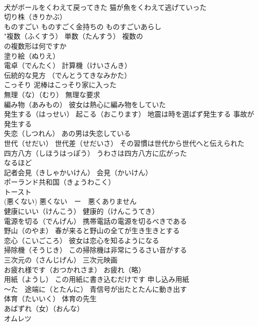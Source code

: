 \documentclass[8pt]{extreport}
\begin{document}
\begin{CJK}{UTF8}{min}
\\	犬がボールをくわえて戻ってきた 猫が魚をくわえて逃げていった
\\	切り株（きりかぶ）
\\	ものすごい ものすごく金持ちの ものすごいあらし
\\	"複数（ふくすう） 単数（たんすう） 複数の 
\\	の複数形は何ですか
\\	塗り絵（ぬりえ）
\\	電卓（でんたく） 計算機（けいさんき）
\\	伝統的な見方 （でんとうてきなみかた）
\\	こっそり 泥棒はこっそり家に入った
\\	無理（な）（むり） 無理な要求
\\	編み物（あみもの） 彼女は熱心に編み物をしていた
\\	発生する（はっせい） 起こる（おこります） 地震は時を選ばず発生する 事故が発生する
\\	失恋（しつれん） あの男は失恋している
\\	世代（せだい） 世代差（せだいさ） その習慣は世代から世代へと伝えられた
\\	四方八方（しほうはっぽう） うわさは四方八方に広がった
\\	なるほど
\\	記者会見（きしゃかいけん） 会見（かいけん） 
\\	ポーランド共和国（きょうわこく）
\\	トースト
\\	(悪くない)	悪くない　ー　悪くありません
\\	健康にいい（けんこう） 健康的（けんこうてき）
\\	電源を切る（でんげん） 携帯電話の電源を切るべきである
\\	野山（のやま） 春が来ると野山の全てが生き生きとする
\\	恋心（こいごころ） 彼女は恋心を知るようになる
\\	掃除機（そうじき） この掃除機は非常にうるさい音がする
\\	三次元の（さんじげん） 三次元映画
\\	お疲れ様です（おつかれさま） お疲れ（略）
\\	用紙（ようし） この用紙に書き込むだけです 申し込み用紙
\\	～た　途端に（とたんに） 青信号が出たとたんに動き出す
\\	体育（たいいく） 体育の先生
\\	あばずれ（女）（おんな）
\\	オムレツ

\end{CJK}
\end{document}
